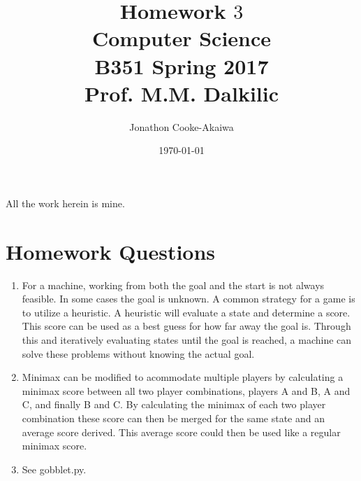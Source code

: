 \documentclass{article}
\begin{document}
\title{Homework $3$\\ Computer Science \\ B351 Spring 2017\\ Prof. M.M. Dalkilic}         %
\author{Jonathon Cooke-Akaiwa}        %
\date{\today}          %
\maketitle


\makeatother     %




\pagestyle{plain}
All the work herein is mine.

\section*{Homework Questions}
\begin{enumerate}
\item For a machine, working from both the goal and the start is not always feasible.  In some cases the goal is unknown.  A common strategy for a game is to utilize a heuristic.  A heuristic will evaluate a state and determine a score.  This score can be used as a best guess for how far away the goal is.  Through this and iteratively evaluating states until the goal is reached, a machine can solve these problems without knowing the actual goal.   
\item Minimax can be modified to acommodate multiple players by calculating a minimax score between all two player combinations, players A and B, A and C, and finally B and C.   By calculating the minimax of each two player combination these score can then be merged for the same state and an average score derived.  This average score could then be used like a regular minimax score.
\item See gobblet.py.
\end{enumerate}
\end{document}
